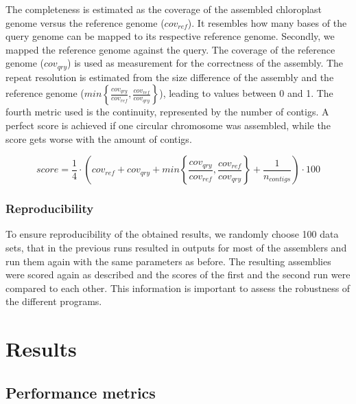 \documentclass{bmcart}
\begin{document}
The completeness is estimated as the coverage of the assembled chloroplast genome versus the reference genome ($cov_{ref}$). It resembles how many bases of the query genome can be mapped to its respective reference genome. Secondly, we mapped the reference genome against the query. The coverage of the reference genome ($cov_{qry}$) is used as measurement for the correctness of the assembly. The repeat resolution is estimated from the size difference of the assembly and the reference genome ($min\left\{ \frac{cov_{qry}}{cov_{ref}}, \frac{cov_{ref}}{cov_{qry}}\right\}$), leading to values between 0 and 1. The fourth metric used is the continuity, represented by the number of contigs. A perfect score is achieved if one circular chromosome was assembled, while the score gets worse with the amount of contigs.

\begin{equation}
   score = \frac{1}{4} \cdot \left( cov_{ref} +  cov_{qry} + min\left\{ \frac{cov_{qry}}{cov_{ref}}, \frac{cov_{ref}}{cov_{qry}}\right\} + \frac{1}{n_{contigs} }\right) \cdot 100 
   \label{eq:quantitative}
\end{equation}

\subsubsection*{Reproducibility}
To ensure reproducibility of the obtained results, we randomly choose  \num{100} data sets, that in the previous runs resulted in outputs for most of the assemblers and run them again with the same parameters as before. The resulting assemblies were scored again as described and the scores of the first and the second run were compared to each other. This information is important to assess the robustness of the different programs.

\section*{Results}
\subsection*{Performance metrics}
\end{document}

